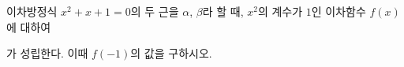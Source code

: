 이차방정식 $x^2+x+1=0$의 두 근을 $\alpha$, $\beta$라 할 때, $x^2$의 계수가 $1$인 이차함수 $f(x)$에 대하여 \par\smallskip{}\par\smallskip\noindent 가 성립한다. 이때 $f(-1)$의 값을 구하시오.
